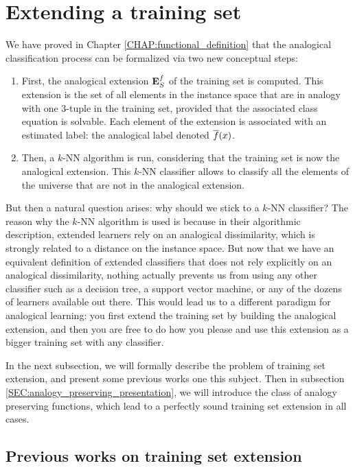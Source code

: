 \section{Extending a training set}
\label{SEC:extending_a_training_set}

We have proved in Chapter \ref{CHAP:functional_definition} that the analogical
classification process can be formalized via two new conceptual steps:
\begin{enumerate}
  \item First, the analogical extension $\mathbf{E}_{S}^{f}$ of the training set is computed. This
    extension is the set of all elements in the instance space that are in
    analogy with one $3$-tuple in the training set, provided that the
    associated class equation is solvable. Each element of the extension is
    associated with an estimated label: the analogical label denoted $\overline{f}(x)$.
  \item Then, a $k$-NN algorithm is run, considering that the training set is
    now the analogical extension. This $k$-NN classifier allows to
    classify all the elements of the universe that are not in the analogical
    extension.
\end{enumerate}

But then a natural question arises: why should we stick to a $k$-NN classifier?
The reason why the $k$-NN algorithm is used is because in their algorithmic
description, extended learners rely on an analogical dissimilarity, which is
strongly related to a distance on the instance space. But now that we have an
equivalent definition of extended classifiers that does not rely explicitly on
an analogical dissimilarity, nothing actually prevents us from using any other
classifier such as a decision tree, a support vector machine, or any of the
dozens of learners available out there. This would lead us to a different
paradigm for analogical learning: you first extend the training set by building
the analogical extension, and then you are free to do how you please and use
this extension as a bigger training set with any classifier.

In the next subsection, we will formally describe the problem of training set
extension, and present some previous works one this subject. Then in subsection
\ref{SEC:analogy_preserving_presentation}, we will introduce the class of
analogy preserving functions, which lead to a perfectly sound training set
extension in all cases.

\subsection{Previous works on training set extension}

